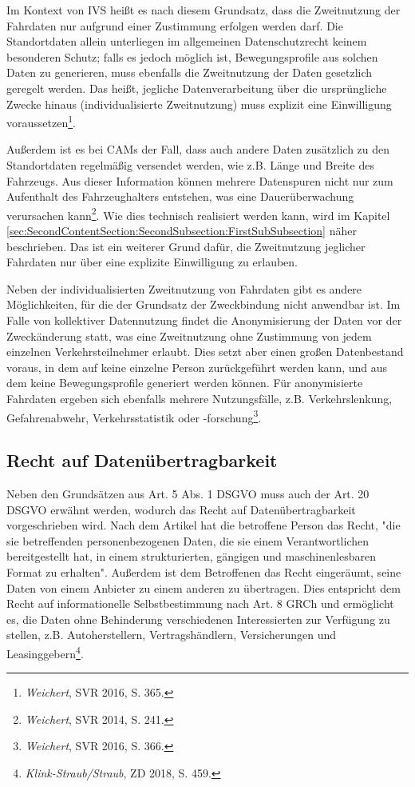 Im Kontext von IVS heißt es nach diesem Grundsatz, dass die Zweitnutzung der Fahrdaten nur aufgrund einer Zustimmung erfolgen werden darf. Die Standortdaten allein unterliegen im allgemeinen Datenschutzrecht keinem besonderen Schutz; falls es jedoch möglich ist, Bewegungsprofile aus solchen Daten zu generieren, muss ebenfalls die Zweitnutzung der Daten gesetzlich geregelt werden. Das heißt, jegliche Datenverarbeitung über die ursprüngliche Zwecke hinaus (individualisierte Zweitnutzung) muss explizit eine Einwilligung voraussetzen\footnote{\emph{Weichert}, SVR 2016, S. 365.}. \nocite{Weichert2016}

Außerdem ist es bei CAMs der Fall, dass auch andere Daten zusätzlich zu den Standortdaten regelmäßig versendet werden, wie z.B. Länge und Breite des Fahrzeugs. Aus dieser Information können mehrere Datenspuren nicht nur zum Aufenthalt des Fahrzeughalters entstehen, was eine Dauerüberwachung verursachen kann\footnote{\emph{Weichert}, SVR 2014, S. 241.}. \nocite{Weichert2014}Wie dies technisch realisiert werden kann, wird im Kapitel \ref{sec:SecondContentSection:SecondSubsection:FirstSubSubsection} näher beschrieben. Das ist ein weiterer Grund dafür, die Zweitnutzung jeglicher Fahrdaten nur über eine explizite Einwilligung zu erlauben. 

Neben der individualisierten Zweitnutzung von Fahrdaten gibt es andere Möglichkeiten, für die der Grundsatz der Zweckbindung nicht anwendbar ist. Im Falle von kollektiver Datennutzung findet die Anonymisierung der Daten vor der Zweckänderung statt, was eine Zweitnutzung ohne Zustimmung von jedem einzelnen Verkehrsteilnehmer erlaubt. Dies setzt aber einen großen Datenbestand voraus, in dem auf keine einzelne Person zurückgeführt werden kann, und aus dem keine Bewegungsprofile generiert werden können. Für anonymisierte Fahrdaten ergeben sich ebenfalls mehrere Nutzungsfälle, z.B. Verkehrslenkung, Gefahrenabwehr, Verkehrsstatistik oder -forschung\footnote{\emph{Weichert}, SVR 2016, S. 366.}.

\subsection{Recht auf Datenübertragbarkeit}

Neben den Grundsätzen aus Art. 5 Abs. 1 DSGVO muss auch der Art. 20 DSGVO erwähnt werden, wodurch das Recht auf Datenübertragbarkeit vorgeschrieben wird. Nach dem Artikel hat die betroffene Person das Recht, "die sie betreffenden personenbezogenen Daten, die sie einem Verantwortlichen bereitgestellt hat, in einem strukturierten, gängigen und maschinenlesbaren Format zu erhalten". Außerdem ist dem Betroffenen das Recht eingeräumt, seine Daten von einem Anbieter zu einem anderen zu übertragen. Dies entspricht dem Recht auf informationelle Selbstbestimmung nach Art. 8 GRCh und ermöglicht es, die Daten ohne Behinderung verschiedenen Interessierten zur Verfügung zu stellen, z.B. Autoherstellern, Vertragshändlern, Versicherungen und Leasinggebern\footnote{\emph{Klink-Straub/Straub}, ZD 2018, S. 459.}. \nocite{Straub2018}

